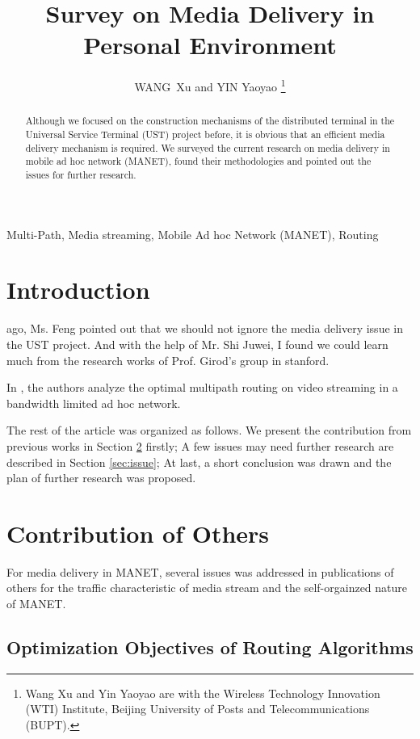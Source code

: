 \documentclass{IEEEtran}
\title{Survey on Media Delivery in Personal Environment}
\author{%
	WANG~Xu and YIN Yaoyao%
	\thanks{Wang Xu and Yin Yaoyao are with the Wireless 
	Technology Innovation (WTI) Institute, Beijing University 
	of Posts and Telecommunications (BUPT).}}
\begin{document}
\maketitle

\begin{abstract}
	Although we focused on the construction mechanisms of the distributed terminal in the Universal Service Terminal (UST) project before, it is obvious that an efficient media delivery mechanism is required. We surveyed the current research on media delivery in mobile ad hoc network (MANET), found their methodologies and pointed out the issues for further research.
\end{abstract}

\begin{keywords}
	Multi-Path, Media streaming, Mobile Ad hoc Network (MANET), Routing
\end{keywords}

\section{Introduction}

 ago, Ms. Feng pointed out that we should not ignore the media delivery issue in the UST project. And with the help of Mr. Shi Juwei, I found we could learn much from the research works of Prof. Girod's group\cite{bib:crosslayer} in stanford.

In \cite{bib:setton_icme2004}, the authors analyze the optimal multipath routing on video streaming in a bandwidth limited ad hoc network.

The rest of the article was organized as follows. We present the contribution from previous works in Section \ref{sec:contrib} firstly; A few issues may need further research are described in Section \ref{sec:issue}; At last, a short conclusion was drawn and the plan of further research was proposed.

\section{Contribution of Others}\label{sec:contrib}

For media delivery in MANET, several issues was addressed in publications of others for the traffic characteristic of media stream and the self-orgainzed nature of MANET.

\subsection{Optimization Objectives of Routing Algorithms}
\end{document}
